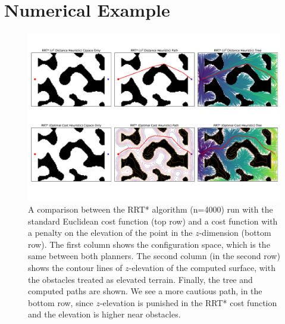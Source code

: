 \documentclass[letterpaper, 12pt]{article}
\begin{document}
\section{Numerical Example}
\begin{figure}
    \centering
    \includegraphics[width=0.9\linewidth]{./figures/rrt_surface_fig.pdf}
    \caption{A comparison between the RRT* algorithm (n=4000) run with the standard Euclidean cost function (top row) and a cost function with a penalty on the elevation of the point in the $z$-dimension (bottom row). The first column shows the configuration space, which is the same between both planners. The second column (in the second row) shows the contour lines of $z$-elevation of the computed surface, with the obstacles treated as elevated terrain. Finally, the tree and computed paths are shown. We see a more cautious path, in the bottom row, since $z$-elevation is punished in the RRT* cost function and the elevation is higher near obstacles.}
\end{figure}
\end{document}
